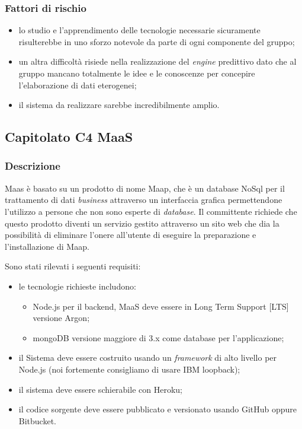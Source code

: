 \documentclass[12pt,a4paper]{article}
\begin{document}
\subsubsection{Fattori di rischio}

\begin{itemize}
\item lo studio e l'apprendimento delle tecnologie necessarie sicuramente risulterebbe in uno sforzo notevole da parte di ogni componente del gruppo;

\item un altra difficoltà risiede nella realizzazione del \textit{engine} predittivo dato che al gruppo mancano totalmente le idee e le conoscenze per concepire l'elaborazione di dati eterogenei;
\item il sistema da realizzare sarebbe incredibilmente amplio.
\end{itemize}

\newpage
\subsection{Capitolato C4 MaaS}
\subsubsection{Descrizione}
Maas è basato su un prodotto di nome Maap, che è un database NoSql per il trattamento di dati \textit{business} attraverso un interfaccia grafica permettendone l'utilizzo a persone che non sono esperte di \textit{database}. Il committente richiede che questo prodotto diventi un servizio gestito attraverso un sito web che dia la possibilità di eliminare l'onere all'utente di eseguire la preparazione e l'installazione di Maap.

Sono stati rilevati i seguenti requisiti:

\begin{itemize}

\item le tecnologie richieste includono:

\begin{itemize}
\item Node.js per il backend, MaaS deve essere in Long Term Support [LTS] versione Argon;
\item mongoDB versione maggiore di 3.x come database per l'applicazione; 
\end{itemize}

\item il Sistema deve essere costruito usando un \textit{framework} di alto livello per Node.js (noi fortemente consigliamo di usare IBM loopback);

\item il sistema deve essere schierabile con Heroku;
 
\item il codice sorgente deve essere pubblicato e versionato usando GitHub oppure Bitbucket. 

\end{itemize}
\end{document}
